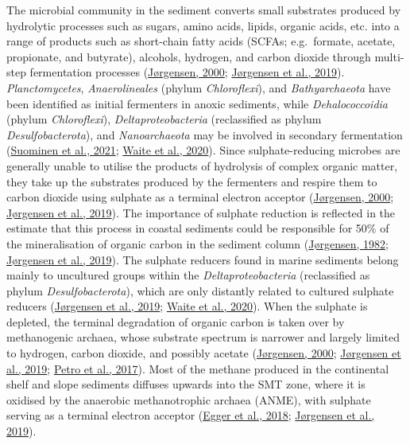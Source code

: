 \documentclass[
  12 pt,
]{book}
\begin{document}
The microbial community in the sediment converts small substrates produced by hydrolytic processes such as sugars, amino acids, lipids, organic acids, etc. into a range of products such as short-chain fatty acids (SCFAs; e.g.~formate, acetate, propionate, and butyrate), alcohols, hydrogen, and carbon dioxide through multi-step fermentation processes (\protect\hyperlink{ref-Jorgensen2000}{Jørgensen, 2000}; \protect\hyperlink{ref-Jorgensen2019}{Jørgensen et al., 2019}). \emph{Planctomycetes}, \emph{Anaerolineales} (phylum \emph{Chloroflexi}), and \emph{Bathyarchaeota} have been identified as initial fermenters in anoxic sediments, while \emph{Dehalococcoidia} (phylum \emph{Chloroflexi}), \emph{Deltaproteobacteria} (reclassified as phylum \emph{Desulfobacterota}), and \emph{Nanoarchaeota} may be involved in secondary fermentation (\protect\hyperlink{ref-Suominen2021}{Suominen et al., 2021}; \protect\hyperlink{ref-Waite2020}{Waite et al., 2020}). Since sulphate-reducing microbes are generally unable to utilise the products of hydrolysis of complex organic matter, they take up the substrates produced by the fermenters and respire them to carbon dioxide using sulphate as a terminal electron acceptor (\protect\hyperlink{ref-Jorgensen2000}{Jørgensen, 2000}; \protect\hyperlink{ref-Jorgensen2019}{Jørgensen et al., 2019}). The importance of sulphate reduction is reflected in the estimate that this process in coastal sediments could be responsible for 50\si{\percent} of the mineralisation of organic carbon in the sediment column (\protect\hyperlink{ref-Jorgensen1982}{Jørgensen, 1982}; \protect\hyperlink{ref-Jorgensen2019}{Jørgensen et al., 2019}). The sulphate reducers found in marine sediments belong mainly to uncultured groups within the \emph{Deltaproteobacteria} (reclassified as phylum \emph{Desulfobacterota}), which are only distantly related to cultured sulphate reducers (\protect\hyperlink{ref-Jorgensen2019}{Jørgensen et al., 2019}; \protect\hyperlink{ref-Waite2020}{Waite et al., 2020}). When the sulphate is depleted, the terminal degradation of organic carbon is taken over by methanogenic archaea, whose substrate spectrum is narrower and largely limited to hydrogen, carbon dioxide, and possibly acetate (\protect\hyperlink{ref-Jorgensen2000}{Jørgensen, 2000}; \protect\hyperlink{ref-Jorgensen2019}{Jørgensen et al., 2019}; \protect\hyperlink{ref-Petro2017}{Petro et al., 2017}). Most of the methane produced in the continental shelf and slope sediments diffuses upwards into the SMT zone, where it is oxidised by the anaerobic methanotrophic archaea (ANME), with sulphate serving as a terminal electron acceptor (\protect\hyperlink{ref-Egger2018}{Egger et al., 2018}; \protect\hyperlink{ref-Jorgensen2019}{Jørgensen et al., 2019}).
\end{document}
